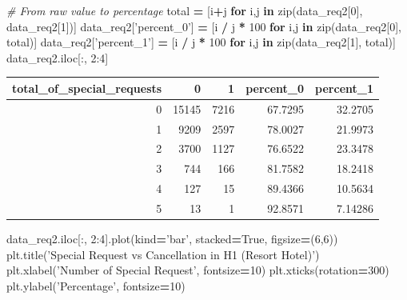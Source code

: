 \documentclass[10pt,a4paper]{article}
\newenvironment{Shaded}{\begin{snugshade}}{\end{snugshade}}
\newcommand{\BuiltInTok}[1]{#1}
\newcommand{\CommentTok}[1]{\textcolor[rgb]{0.56,0.35,0.01}{\textit{#1}}}
\newcommand{\ControlFlowTok}[1]{\textcolor[rgb]{0.13,0.29,0.53}{\textbf{#1}}}
\newcommand{\DecValTok}[1]{\textcolor[rgb]{0.00,0.00,0.81}{#1}}
\newcommand{\KeywordTok}[1]{\textcolor[rgb]{0.13,0.29,0.53}{\textbf{#1}}}
\newcommand{\NormalTok}[1]{#1}
\newcommand{\OperatorTok}[1]{\textcolor[rgb]{0.81,0.36,0.00}{\textbf{#1}}}
\newcommand{\StringTok}[1]{\textcolor[rgb]{0.31,0.60,0.02}{#1}}
\newcommand{\VariableTok}[1]{\textcolor[rgb]{0.00,0.00,0.00}{#1}}
\theoremstyle{break}
\begin{document}
\begin{Shaded}
\begin{Highlighting}[]
\CommentTok{# From raw value to percentage}
\NormalTok{total }\OperatorTok{=}\NormalTok{ [i}\OperatorTok{+}\NormalTok{j }\ControlFlowTok{for}\NormalTok{ i,j }\KeywordTok{in} \BuiltInTok{zip}\NormalTok{(data_req2[}\DecValTok{0}\NormalTok{], data_req2[}\DecValTok{1}\NormalTok{])]}
\NormalTok{data_req2[}\StringTok{'percent_0'}\NormalTok{] }\OperatorTok{=}\NormalTok{ [i }\OperatorTok{/}\NormalTok{ j }\OperatorTok{*} \DecValTok{100} \ControlFlowTok{for}\NormalTok{ i,j }\KeywordTok{in} \BuiltInTok{zip}\NormalTok{(data_req2[}\DecValTok{0}\NormalTok{], total)]}
\NormalTok{data_req2[}\StringTok{'percent_1'}\NormalTok{] }\OperatorTok{=}\NormalTok{ [i }\OperatorTok{/}\NormalTok{ j }\OperatorTok{*} \DecValTok{100} \ControlFlowTok{for}\NormalTok{ i,j }\KeywordTok{in} \BuiltInTok{zip}\NormalTok{(data_req2[}\DecValTok{1}\NormalTok{], total)]}
\NormalTok{data_req2.iloc[:, }\DecValTok{2}\NormalTok{:}\DecValTok{4}\NormalTok{]}
\end{Highlighting}
\end{Shaded}

\begin{longtable}[]{@{}rrrrr@{}}
\toprule
total\_of\_special\_requests & 0 & 1 & percent\_0 & percent\_1\tabularnewline
\midrule
\endhead
0 & 15145 & 7216 & 67.7295 & 32.2705\tabularnewline
1 & 9209 & 2597 & 78.0027 & 21.9973\tabularnewline
2 & 3700 & 1127 & 76.6522 & 23.3478\tabularnewline
3 & 744 & 166 & 81.7582 & 18.2418\tabularnewline
4 & 127 & 15 & 89.4366 & 10.5634\tabularnewline
5 & 13 & 1 & 92.8571 & 7.14286\tabularnewline
\bottomrule
\end{longtable}

\begin{Shaded}
\begin{Highlighting}[]
\NormalTok{data_req2.iloc[:, }\DecValTok{2}\NormalTok{:}\DecValTok{4}\NormalTok{].plot(kind}\OperatorTok{=}\StringTok{'bar'}\NormalTok{, stacked}\OperatorTok{=}\VariableTok{True}\NormalTok{, figsize}\OperatorTok{=}\NormalTok{(}\DecValTok{6}\NormalTok{,}\DecValTok{6}\NormalTok{))}
\NormalTok{plt.title(}\StringTok{'Special Request vs Cancellation in H1 (Resort Hotel)'}\NormalTok{)}
\NormalTok{plt.xlabel(}\StringTok{'Number of Special Request'}\NormalTok{, fontsize}\OperatorTok{=}\DecValTok{10}\NormalTok{)}
\NormalTok{plt.xticks(rotation}\OperatorTok{=}\DecValTok{300}\NormalTok{)}
\NormalTok{plt.ylabel(}\StringTok{'Percentage'}\NormalTok{, fontsize}\OperatorTok{=}\DecValTok{10}\NormalTok{)}
\end{Highlighting}
\end{Shaded}
\end{document}
